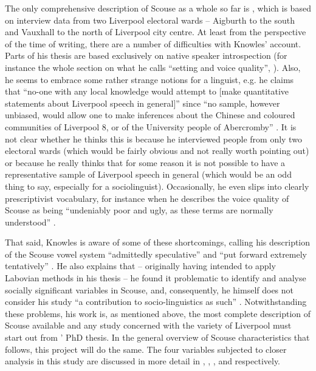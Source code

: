 The only comprehensive description of Scouse as a whole so far is \cite{knowles1973}, which is based on interview data from two Liverpool electoral wards -- Aigburth to the south and Vauxhall to the north of Liverpool city centre.
At least from the perspective of the time of writing, there are a number of difficulties with Knowles' account.
Parts of his thesis are based exclusively on native speaker introspection (for instance the whole section on what he calls ``setting and voice quality'', \citealt[cf.][102]{knowles1973}).
Also, he seems to embrace some rather strange notions for a linguist, e.g. he claims that ``no-one with any local knowledge would attempt to [make quantitative statements about Liverpool speech in general]'' since ``no sample, however unbiased, would allow one to make inferences about the Chinese and coloured communities of Liverpool 8, or of the University people of Abercromby'' \citep[3]{knowles1973}.
It is not clear whether he thinks this is because he interviewed people from only two electoral wards (which would be fairly obvious and not really worth pointing out) or because he really thinks that for some reason it is not possible to have a representative sample of Liverpool speech in general (which would be an odd thing to say, especially for a sociolinguist).
Occasionally, he even slips into clearly prescriptivist vocabulary, for instance when he describes the voice quality of Scouse as being ``undeniably poor and ugly, as these terms are normally understood'' \citep[116]{knowles1973}.

That said, Knowles is aware of some of these shortcomings, calling his description of the Scouse vowel system ``admittedly speculative'' and ``put forward extremely tentatively'' \citep[111]{knowles1973}.
He also explains that -- originally having intended to apply Labovian methods in his thesis -- he found it problematic to identify and analyse socially significant variables in Scouse, and, consequently, he himself does not consider his study ``a contribution to socio-linguistics as such'' \citep[cf.][1]{knowles1973}.
Notwithstanding these problems, his work is, as mentioned above, the most complete description of Scouse available and any study concerned with the variety of Liverpool must start out from \citeauthor{knowles1973}' PhD thesis.
In the general overview of Scouse characteristics that follows, this project will do the same.
The four variables subjected to closer analysis in this study are discussed in more detail in , , , and  respectively.


